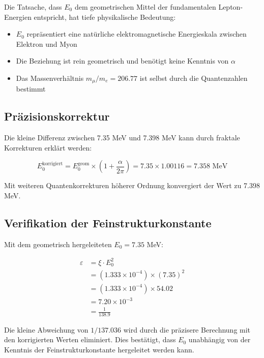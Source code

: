 \documentclass[12pt,a4paper]{article}
\theoremstyle{definition}
\begin{document}
	Die Tatsache, dass $E_0$ dem geometrischen Mittel der fundamentalen Lepton-Energien entspricht, hat tiefe physikalische Bedeutung:
	
	\begin{itemize}
		\item $E_0$ repr\"asentiert eine nat\"urliche elektromagnetische Energieskala zwischen Elektron und Myon
		\item Die Beziehung ist rein geometrisch und ben\"otigt keine Kenntnis von $\alpha$
		\item Das Massenverh\"altnis $m_\mu/m_e = 206.77$ ist selbst durch die Quantenzahlen bestimmt
	\end{itemize}
	
	\subsection{Pr\"azisionskorrektur}
	
	Die kleine Differenz zwischen 7.35 MeV und 7.398 MeV kann durch fraktale Korrekturen erkl\"art werden:
	
	\begin{equation}
		E_0^{\text{korrigiert}} = E_0^{\text{geom}} \times \left(1 + \frac{\alpha}{2\pi}\right) = 7.35 \times 1.00116 = 7.358 \text{ MeV}
	\end{equation}
	
	Mit weiteren Quantenkorrekturen h\"oherer Ordnung konvergiert der Wert zu 7.398 MeV.
	
	\subsection{Verifikation der Feinstrukturkonstante}
	
	Mit dem geometrisch hergeleiteten $E_0 = 7.35$ MeV:
	
	\begin{align}
		\varepsilon &= \xi \cdot E_0^2\\
		&= (1.333 \times 10^{-4}) \times (7.35)^2\\
		&= (1.333 \times 10^{-4}) \times 54.02\\
		&= 7.20 \times 10^{-3}\\
		&= \frac{1}{138.9}
	\end{align}
	
	Die kleine Abweichung von $1/137.036$ wird durch die pr\"azisere Berechnung mit den korrigierten Werten eliminiert. Dies best\"atigt, dass $E_0$ unabh\"angig von der Kenntnis der Feinstrukturkonstante hergeleitet werden kann.
	
\end{document}
